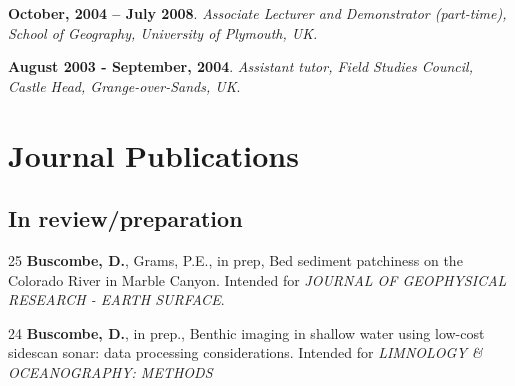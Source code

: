 \documentclass[margin,line]{resume}
\begin{document}
\begin{resume}
\begin{footnotesize}
    {\bf October, 2004 -- July 2008}. {\sl Associate Lecturer and Demonstrator (part-time), School of Geography, University of Plymouth, UK.}

    {\bf August 2003 - September, 2004}. {\sl Assistant tutor, Field Studies Council, Castle Head, Grange-over-Sands, UK}. %
        \end{footnotesize}

    \section{\mysidestyle Journal Publications}

    \begin{footnotesize}
    


	\subsection{\mysidestyle In review/preparation}
	\begin{list1}

	\item[25] {\bf Buscombe, D.}, Grams, P.E., in prep, Bed sediment patchiness on the Colorado River in Marble Canyon. Intended for {\sl JOURNAL OF GEOPHYSICAL RESEARCH - EARTH SURFACE}.\\
	
	\item[24] {\bf Buscombe, D.}, in prep., Benthic imaging in shallow water using low-cost sidescan sonar: data processing considerations. Intended for {\sl LIMNOLOGY \& OCEANOGRAPHY: METHODS}\\
	

\end{list1}
\end{footnotesize}
\end{resume}
\end{document}
